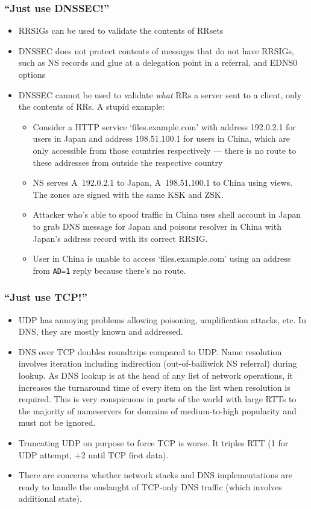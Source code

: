 \documentclass{beamer}
\begin{document}
\frame
{
  \frametitle{``Just use DNSSEC!''}

  \begin{itemize}
  \item RRSIGs can be used to validate the contents of RRsets
  \item DNSSEC does not protect contents of messages that do not have
    RRSIGs, such as NS records and glue at a delegation point in a
    referral, and EDNS0 options
  \item DNSSEC cannot be used to validate {\em what} RRs a server sent
    to a client, only the contents of RRs. A stupid example:
    \begin{itemize}
    \item Consider a HTTP service `files.example.com' with address
      192.0.2.1 for users in Japan and address 198.51.100.1 for users in
      China, which are only accessible from those countries respectively
      --- there is no route to these addresses from outside the
      respective country
    \item NS serves A~192.0.2.1 to Japan, A~198.51.100.1 to China
      using views. The zones are signed with the same KSK and ZSK.
    \item Attacker who's able to spoof traffic in China uses shell
      account in Japan to grab DNS message for Japan and poisons
      resolver in China with Japan's address record with its correct
      RRSIG.
    \item User in China is unable to access `files.example.com' using an
      address from \texttt{AD=1} reply because there's no route.
    \end{itemize}
  \end{itemize}
}

\frame
{
  \frametitle{``Just use TCP!''}

  \begin{itemize}
  \item UDP has annoying problems allowing poisoning, amplification
    attacks, etc. In DNS, they are mostly known and addressed.
  \item DNS over TCP doubles roundtrips compared to UDP. Name resolution
    involves iteration including indirection (out-of-bailiwick NS
    referral) during lookup. As DNS lookup is at the head of any list of
    network operations, it increases the turnaround time of every item
    on the list when resolution is required. This is very conspicuous in
    parts of the world with large RTTs to the majority of nameservers
    for domains of medium-to-high popularity and must not be ignored.
  \item Truncating UDP on purpose to force TCP is worse. It triples
    RTT (1 for UDP attempt, +2 until TCP first data).
  \item There are concerns whether network stacks and DNS
    implementations are ready to handle the onslaught of TCP-only DNS
    traffic (which involves additional state).
  \end{itemize}
}
\end{document}
